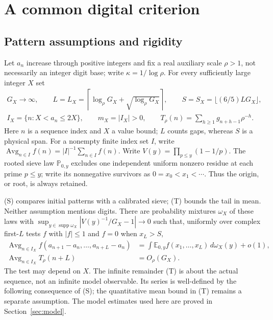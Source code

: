 \documentclass[11pt,a4paper]{article}
\newcommand{\E}{\mathbb E}
\newcommand{\Prob}{\mathbb P}
\DeclareMathOperator{\Avg}{Avg}
\begin{document}
\section{A common digital criterion}\label{sec:criterion}

\subsection{Pattern assumptions and rigidity}\label{sec:patternrigidity}

Let $a_n$ increase through positive integers and fix a real auxiliary
scale $\rho>1$, not necessarily an integer digit base; write
$\kappa=1/\log\rho$. For every sufficiently
large integer $X$ set
\begin{equation}\label{eq:profile}
 \begin{gathered}
 G_X\to\infty,\qquad L=L_X=\left\lceil\log_\rho G_X+\sqrt{\log_\rho G_X}\right\rceil,
 \qquad S=S_X=\lfloor(6/5)LG_X\rfloor,\\
 I_X=\{n:X<a_n\le2X\},\qquad m_X=|I_X|>0,\qquad
 T_\rho(n)=\sum_{h\ge1}g_{n+h-1}\rho^{-h}.
 \end{gathered}
\end{equation}
Here $n$ is a sequence index and $X$ a value bound;
$L$ counts gaps, whereas $S$ is a physical span.
For a nonempty finite index set $I$, write
$\Avg_{n\in I}f(n)=|I|^{-1}\sum_{n\in I}f(n)$.
Write $V(y)=\prod_{p\le y}(1-1/p)$. The rooted sieve law $\Prob_{0,y}$
excludes one independent uniform nonzero residue at each prime $p\le y$;
write its nonnegative survivors as $0=x_0<x_1<\cdots$.
Thus the origin, or root, is always retained.

(S) compares initial patterns with a calibrated sieve; (T) bounds the
tail in mean. Neither assumption mentions digits.
There are probability mixtures
$\omega_X$ of these laws with
$\sup_{y\in\operatorname{supp}\omega_X}|V(y)^{-1}/G_X-1|\to0$ such that,
uniformly over complex first-$L$ tests $f$ with $|f|\le1$ and
$f=0$ when $x_L>S$,
\begin{align}
 \Avg_{n\in I_X}f(a_{n+1}-a_n,\ldots,a_{n+L}-a_n)
   &=\int\E_{0,y}f(x_1,\ldots,x_L)\,d\omega_X(y)+o(1),\tag{S}\label{eq:S}\\
 \Avg_{n\in I_X}T_\rho(n+L)&=O_\rho(G_X).\tag{T}\label{eq:T}
\end{align}
The test may depend on $X$. The infinite remainder (T) is about the
actual sequence, not an infinite model observable. Its series is
well-defined by the following consequence of (S); the quantitative mean
bound in (T) remains a separate assumption. The model estimates used
here are proved in Section~\ref{sec:model}.
\end{document}
